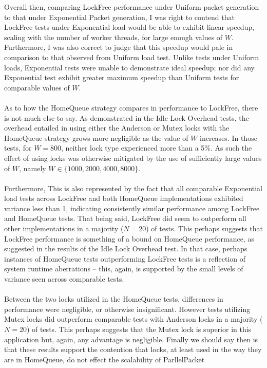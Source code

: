 \documentclass[]{article}
\begin{document}
Overall then, comparing LockFree performance under Uniform packet generation to that under Exponential Packet generation, I was right to contend that LockFree tests under Exponential load would be able to exhibit linear speedup, scaling with the number of worker threads, for large enough values of $W$. Furthermore, I was also correct to judge that this speedup would pale in comparison to that observed from Uniform load test. Unlike tests under Uniform loads, Exponential tests were unable to demonstrate ideal speedup; nor did any Exponential test exhibit greater maximum speedup than Uniform tests for comparable values of $W$.
\\\\
As to how the HomeQueue strategy compares in performance to LockFree, there is not much else to say. As demonstrated in the Idle Lock Overhead tests, the overhead entailed in using either the Anderson or Mutex locks with the HomeQueue strategy grows more negligible as the value of $W$ increases. In those tests, for $W = 800$, neither lock type experienced more than a 5\%. As such the effect of using locks was otherwise mitigated by the use of sufficiently large values of $W$, namely $W \in \{1000, 2000, 4000, 8000\}$. 
\\\\
Furthermore, This is also represented by the fact that all comparable Exponential load tests across LockFree and both HomeQueue implementations exhibited variance less than 1, indicating consistently similar performance among LockFree and HomeQueue tests. That being said, LockFree did seem to outperform all other implementations in a majority ($N = 20$) of tests. This perhaps suggests that LockFree performance is something of a bound on HomeQueue performance, as suggested in the results of the Idle Lock Overhead test. In that case, perhaps instances of HomeQueue tests outperforming LockFree tests is a reflection of system runtime aberrations -- this, again, is supported by the small levels of variance seen across comparable tests.
\\\\
Between the two locks utilized in the HomeQueue tests, differences in performance were negligible, or otherwise insignificant. However tests utilizing Mutex locks did outperform comparable tests with Anderson locks in a majority ($N = 20$) of tests. This perhaps suggests that the Mutex lock is superior in this application but, again, any advantage is negligible.
Finally we should say then is that these results support the contention that locks, at least used in the way they are in HomeQueue, do not effect the scalability of ParllelPacket
\end{document}
